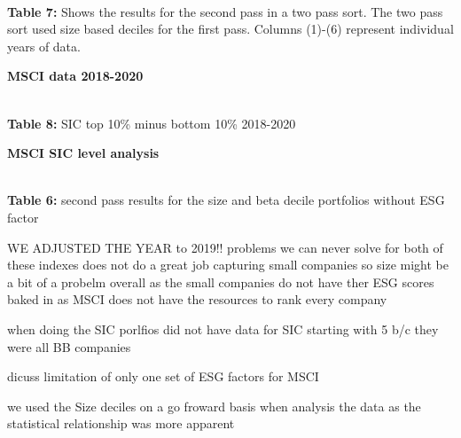 \begin{center}
    \paperspacingnarrow
    \\
    \textbf{Table 7:} Shows the results for the second pass in a two pass sort. The two pass sort used size based deciles for the first pass. Columns (1)-(6) represent individual years of data. 
    \paperspacingwide
\end{center}
 \textbf{MSCI data 2018-2020}\\
 \begin{center}
    \paperspacingnarrow
\\
\textbf{Table 8:} SIC top 10\% minus bottom 10\% 2018-2020
    \paperspacingwide
\end{center}
 \textbf{MSCI SIC level analysis}\\
 
  \begin{center}
    \paperspacingnarrow
    \\
    \textbf{Table 6:} second pass results for the size and beta decile portfolios without ESG factor\\
    \paperspacingwide
\end{center}

 WE ADJUSTED THE YEAR to 2019!!
 problems we can never solve for both of these indexes does not do a great job capturing small companies so size might be a bit of a probelm overall as the small companies do not have ther ESG scores baked in as MSCI does not have the resources to rank every company
 
 when doing the SIC porlfios did not have data for SIC starting with 5 b/c they were all BB companies 

dicuss limitation of only one set of ESG factors for MSCI 
 
 we used the Size deciles on a go froward basis when analysis the data as the statistical relationship was more apparent 